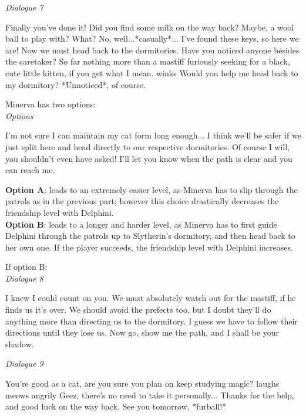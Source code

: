 \textit{Dialogue 7}
\begin{dialogue} 
 Finally you've done it! Did you find some milk on the way back? Maybe, a wool ball to play with?
 What? No, well...*casually*... I've found these keys, so here we are!
 Now we must head back to the dormitories. Have you noticed anyone besides the caretaker?
So far nothing more than a mastiff furiously seeking for a black, cute little kitten, if you get what I mean. \*winks\*
Would you help me head back to my dormitory? *Unnoticed*, of course.
\end{dialogue} 

Minerva has two options: \\

\textit{Options}
\begin{dialogue}
 I'm not sure I can maintain my cat form long enough... I think we'll be safer if we just split here and head directly to our respective dormitories.
Of course I will, you shouldn't even have asked! I'll let you know when the path is clear and you can reach me.
\end{dialogue} 

\textbf{Option A}: leads to an extremely easier level, as Minerva has to slip through the patrols as in the previous part; however this choice drastically decreases the friendship level with Delphini. \\
\textbf{Option B}: leads to a longer and harder level, as Minerva has to first guide Delphini through the patrols up to Slytherin's dormitory, and then head back to her own one. If the player succeeds, the friendship level with Delphini increases.


If option B: \\

\textit{Dialogue 8}          
\begin{dialogue}
I knew I could count on you. We must absolutely watch out for the mastiff, if he finds us it's over. We should avoid the prefects too, but I doubt they'll do anything more than directing us to the dormitory. I guess we have to follow their directions until they lose us. Now go, show me the path, and I shall be your shadow.
\end{dialogue} 


\textit{Dialogue 9}          
\begin{dialogue}
 You're good as a cat, are you sure you plan on keep studying magic? \*laughs\*
\*meows angrily\*
 Geez, there's no need to take it personally... Thanks for the help, and good luck on the way back. See you tomorrow, *furball!*
\end{dialogue} 

